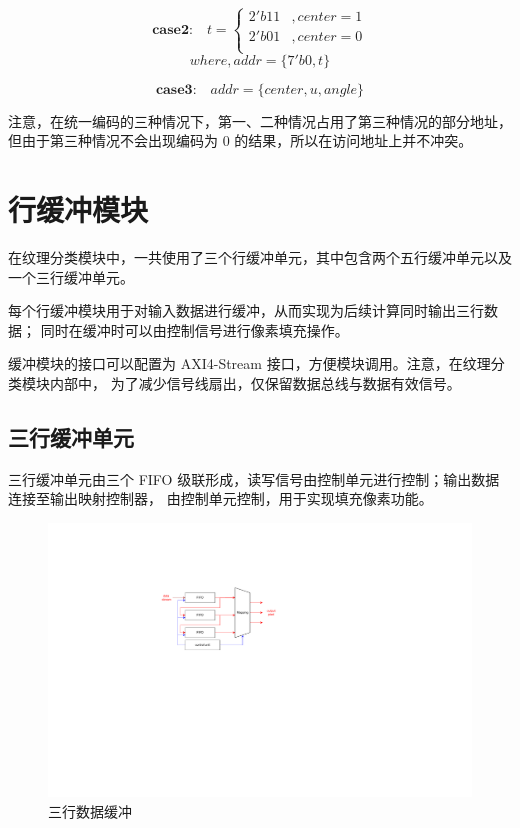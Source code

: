 \documentclass[12pt, a4paper, oneside]{ctexbook}
\begin{document}
	$$
	\textbf{case2:} \quad t=
	\begin{cases}
		2'b11 &,center = 1 \\
		2'b01 &,center = 0 \\
	\end{cases}
	$$
	$$
	where, addr={\{7'b0, t\}}
	$$
		
	
	$$
	\textbf{case3:} \quad addr={\{center, u, angle\}}
	$$
	\par 注意，在统一编码的三种情况下，第一、二种情况占用了第三种情况的部分地址，
	但由于第三种情况不会出现编码为 0 的结果，所以在访问地址上并不冲突。	
	
	\section{行缓冲模块}
	在纹理分类模块中，一共使用了三个行缓冲单元，其中包含两个五行缓冲单元以及一个三行缓冲单元。
	\par 每个行缓冲模块用于对输入数据进行缓冲，从而实现为后续计算同时输出三行数据；
	同时在缓冲时可以由控制信号进行像素填充操作。
	\par 	缓冲模块的接口可以配置为 AXI4-Stream 接口，方便模块调用。注意，在纹理分类模块内部中，
	为了减少信号线扇出，仅保留数据总线与数据有效信号。
	\subsection{三行缓冲单元}
	三行缓冲单元由三个 FIFO 级联形成，读写信号由控制单元进行控制；输出数据连接至输出映射控制器，
	由控制单元控制，用于实现填充像素功能。
		\begin{figure}[h]	
		\centering
		\includegraphics[scale=1]{pic/fifo_3.pdf}
		\caption{三行数据缓冲}
		\end{figure}	
\end{document}
